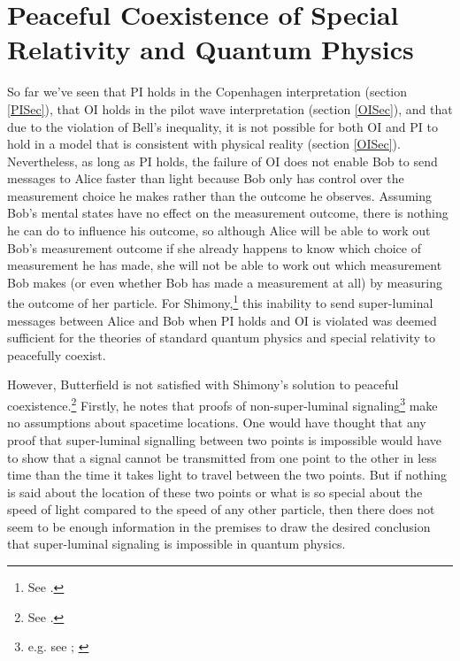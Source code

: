 \section{Peaceful Coexistence of Special Relativity and Quantum Physics}
So far we've seen that PI holds in the Copenhagen interpretation (section \ref{PISec}), that OI holds in the pilot wave interpretation (section \ref{OISec}), and that due to the violation of Bell's inequality, it is not possible for both OI and PI to hold in a model that is consistent with physical reality (section \ref{OISec}). Nevertheless, as long as PI holds, the failure of OI does not enable Bob to send messages to Alice faster than light because Bob only has control over the measurement choice he makes rather than the outcome he observes. Assuming Bob's mental states have no effect on the measurement outcome, there is nothing he can do to influence his outcome, so although Alice will be able to work out Bob's measurement outcome if she already happens to know which choice of measurement he has made, she will not be able to work out which measurement Bob makes (or even whether Bob has made a measurement at all) by measuring the outcome of her particle. For Shimony,\footnote{See \cite[146-147]{Shimony86}.} this inability to send super-luminal messages between Alice and Bob when PI holds and OI is violated was deemed sufficient for the theories of standard quantum physics and special relativity to peacefully coexist. 

However, Butterfield is not satisfied with Shimony's solution to peaceful coexistence.\footnote{See \cite[p. 12]{Butterfield}.} Firstly, he notes that proofs of non-super-luminal signaling\footnote{e.g. see \cite[p. 113--116]{Redhead}; \cite[p. 139--140]{Hiley}} make no assumptions about spacetime locations. One would have thought that any proof that super-luminal signalling between two points is impossible would have to show that a signal cannot be transmitted from one point to the other in less time than the time it takes light to travel between the two points. But if nothing is said about the location of these two points or what is so special about the speed of light compared to the speed of any other particle, then there does not seem to be enough information in the premises to draw the desired conclusion that super-luminal signaling is impossible in quantum physics.

